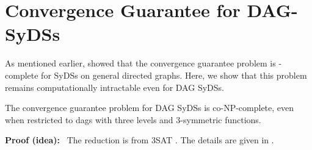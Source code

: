 \section{Convergence Guarantee for DAG-SyDSs}
\label{sec:conv_guarantee}

As mentioned earlier, \cite{Chistikov-etal-2020}
showed that the convergence
guarantee problem is \cpsp-complete for 
SyDSs on general directed graphs.
Here, we show that this problem 
remains computationally intractable even for
DAG SyDSs. 

\begin{theorem}\label{thm:convergence_guaranee}
The convergence guarantee problem for DAG SyDSs is co-NP-complete,
even when restricted to dags with three levels and 3-symmetric functions.
\end{theorem}

\noindent
\textbf{Proof (idea):}~ The reduction is from 3SAT \cite{GJ-1979}.
The details are given in \cite{Rosenkrantz-etal-2020}.


